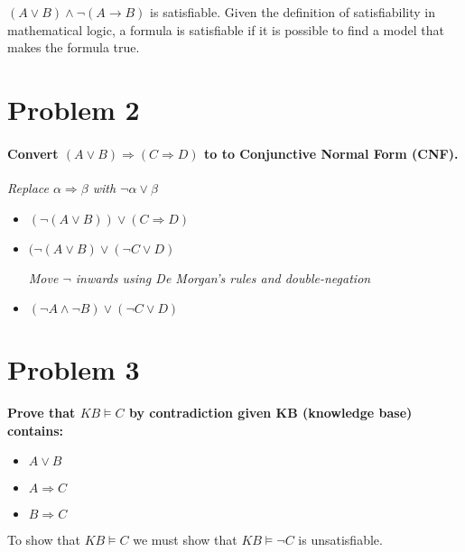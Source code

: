 \documentclass{article}
\begin{document}
\begin{enumerate}
     \textit{$(A \lor B) \land \neg(A \rightarrow B)$} is satisfiable. Given the definition of satisfiability in mathematical logic, a formula is satisfiable if it is possible to find a model that makes the formula true.
\end{enumerate}

\section*{Problem 2}
\paragraph{Convert $(A \lor B) \Rightarrow (C \Rightarrow D)$ to to Conjunctive Normal Form (CNF).\\}
    \begin{center}
    \textit{Replace $\alpha \Rightarrow \beta$ with $\neg \alpha \lor \beta$}
    \end{center}
        \begin{itemize}
        \item $(\neg(A \lor B)) \lor (C \Rightarrow D)$
        \item $(\neg(A \lor B) \lor (\neg C \lor D)$\newline
        \begin{center}
            \textit{Move $\neg$ inwards using De Morgan’s rules and double-negation}\newline
        \end{center}
    
        \item $(\neg A \land \neg B) \lor (\neg C \lor D)$\newline
        \end{itemize}
        
\section*{Problem 3}
\textbf{Prove that $KB \vDash C$ by contradiction given KB (knowledge base) contains:}
\begin{itemize}
    \item $A \lor B$
    \item $A \Rightarrow C$
    \item $B \Rightarrow C$
\end{itemize}
To show that $KB \vDash C$ we must show that $KB \vDash \neg C$ is unsatisfiable.\\ 
\end{document}
